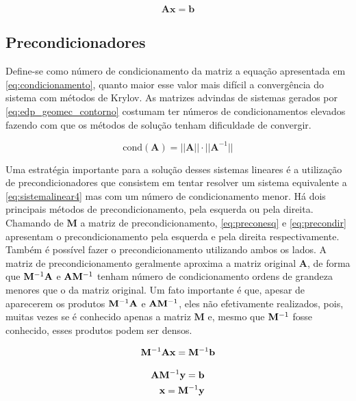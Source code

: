 \begin{equation} \label{eq:sistemalinear4}
    \mathbf{Ax = b}
\end{equation}

\subsection{Precondicionadores}

Define-se como número de condicionamento da matriz a equação apresentada em \eqref{eq:condicionamento}, quanto maior esse valor mais difícil a convergência do sistema com métodos de Krylov. As matrizes advindas de sistemas gerados por \eqref{eq:edp_geomec_contorno} costumam ter números de condicionamentos elevados fazendo com que os métodos de solução tenham dificuldade de convergir.

\begin{equation} \label{eq:condicionamento}
\text{cond}(\mathbf{A}) = || \mathbf{A} || \cdot || \mathbf{A}^{-1} ||
\end{equation}


Uma estratégia importante para a solução desses sistemas lineares é a utilização de precondicionadores que consistem em tentar resolver um sistema equivalente a \eqref{eq:sistemalinear4} mas com um número de condicionamento menor. Há dois principais métodos de precondicionamento, pela esquerda ou pela direita. Chamando de $\mathbf{M}$ a matriz de precondicionamento, \eqref{eq:preconesq} e \eqref{eq:precondir} apresentam o precondicionamento pela esquerda e pela direita respectivamente. Também é possível fazer o precondicionamento utilizando ambos os lados. A matriz de precondicionamento geralmente aproxima a matriz original $\mathbf{A}$, de forma que $\mathbf{M}^{-1} \mathbf{A}$ e $\mathbf{A} \mathbf{M}^{-1}$ tenham número de condicionamento ordens de grandeza menores que o da matriz original. Um fato importante é que, apesar de aparecerem os produtos $\mathbf{M}^{-1} \mathbf{A}$ e $\mathbf{A} \mathbf{M}^{-1}$, eles não efetivamente realizados, pois, muitas vezes se é conhecido apenas a matriz $\mathbf{M}$ e, mesmo que $\mathbf{M}^{-1}$ fosse conhecido, esses produtos podem ser densos.  


\begin{equation} \label{eq:preconesq}
\mathbf{M}^{-1} \mathbf{A} \mathbf{x}= \mathbf{M}^{-1} \mathbf{b}
\end{equation}

\begin{align} \label{eq:precondir}
\mathbf{A} \mathbf{M}^{-1} \mathbf{y} = \mathbf{b} \\
\mathbf{x} = \mathbf{M}^{-1} \mathbf{{y}}
\end{align}



